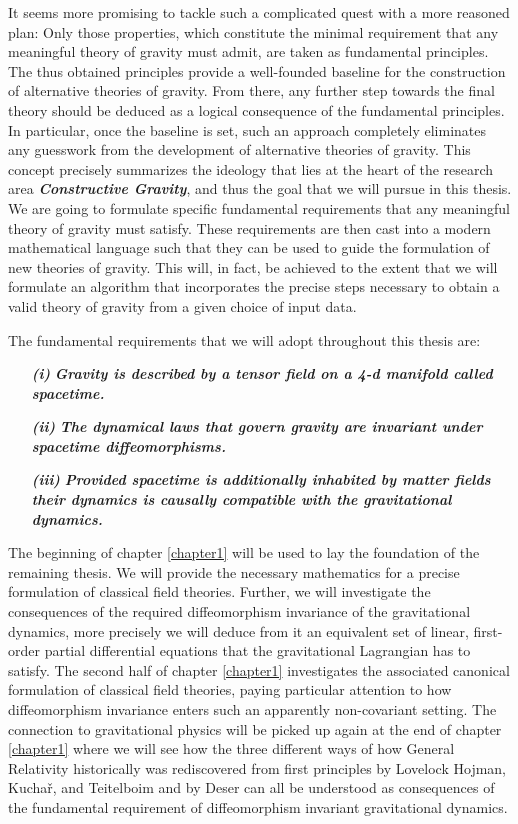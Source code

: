 It seems more promising to tackle such a complicated quest with a more reasoned plan: Only those properties, which constitute the minimal requirement that any meaningful theory of gravity must admit, are taken as fundamental principles. The thus obtained principles  provide a well-founded baseline for the construction of alternative theories of gravity. From there, any further step towards the final theory should be deduced as a logical consequence of the fundamental principles. In particular, once the baseline is set, such an approach completely eliminates any guesswork from the development of alternative theories of gravity. 
This concept precisely summarizes the ideology that lies at the heart of the research area \textit{\textbf{Constructive Gravity}}, and thus the goal that we will pursue in this thesis.
We are going to formulate specific fundamental requirements that any meaningful theory of gravity must satisfy. These requirements are then cast into a modern mathematical language such that they can be used to guide the formulation of new theories of gravity. This will, in fact, be achieved to the extent that we will formulate an algorithm that incorporates the precise steps necessary to obtain a valid theory of gravity from a given choice of input data. 

The fundamental requirements that we will adopt throughout this thesis are:
\begin{itemize}
    \item[\textbf{\textit{(i)}}] \textbf{\textit{Gravity is described by a tensor field on a 4-d manifold called spacetime.}}
    \item[\textbf{\textit{(ii)}}] \textbf{\textit{The dynamical laws that govern gravity are invariant under spacetime diffeomorphisms.}}
    \item[\textbf{\textit{(iii)}}] \textbf{\textit{Provided spacetime is additionally inhabited by matter fields their dynamics is causally compatible with the gravitational dynamics.}}
\end{itemize}

The beginning of chapter \ref{chapter1} will be used to lay the foundation of the remaining thesis. We will provide the necessary mathematics for a precise formulation of classical field theories. Further, we will investigate the consequences of the required diffeomorphism invariance of the gravitational dynamics, more precisely we will deduce from it an equivalent set of linear, first-order partial differential equations that the gravitational Lagrangian has to satisfy. The second half of chapter \ref{chapter1} investigates the associated canonical formulation of classical field theories, paying particular attention to how diffeomorphism invariance enters such an apparently non-covariant setting. The connection to gravitational physics will be picked up again at the end of chapter \ref{chapter1} where we will see how the three different ways of how General Relativity historically was rediscovered from first principles by Lovelock \cite{doi:10.1063/1.1665613} Hojman, Kuchař, and Teitelboim \cite{HOJMAN197688} and by Deser \cite{1970GReGr...1....9D} can all be understood as consequences of the fundamental requirement of diffeomorphism invariant gravitational dynamics.

